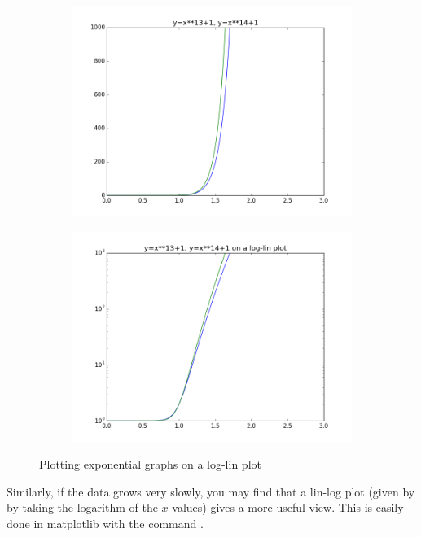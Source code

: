 \begin{figure}[h]
\centering
\begin{subfigure}{.45\textwidth}
\centering
\includegraphics[width=\textwidth]{exponential.png}
\end{subfigure}
\begin{subfigure}{.45\textwidth}
\centering
\includegraphics[width=\textwidth]{exponential_loglin}
\end{subfigure}
\caption{Plotting exponential graphs on a log-lin plot}
\label{fig:exp}
\end{figure}


Similarly, if the data grows very slowly, you may find that a lin-log plot (given by by taking the logarithm of the $x$-values) gives a more useful view.
This is easily done in matplotlib with the command .

